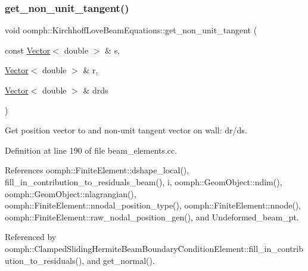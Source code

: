 \mbox{\label{classoomph_1_1KirchhoffLoveBeamEquations_a73584a8199a342faf924def94245bdfd}} 
\subsubsection{\texorpdfstring{get\+\_\+non\+\_\+unit\+\_\+tangent()}{get\_non\_unit\_tangent()}}
{\footnotesize\ttfamily void oomph\+::\+Kirchhoff\+Love\+Beam\+Equations\+::get\+\_\+non\+\_\+unit\+\_\+tangent (\begin{DoxyParamCaption}\item[{const \hyperlink{classoomph_1_1Vector}{Vector}$<$ double $>$ \&}]{s,  }\item[{\hyperlink{classoomph_1_1Vector}{Vector}$<$ double $>$ \&}]{r,  }\item[{\hyperlink{classoomph_1_1Vector}{Vector}$<$ double $>$ \&}]{drds }\end{DoxyParamCaption})}



Get position vector to and non-\/unit tangent vector on wall\+: dr/ds. 



Definition at line 190 of file beam\+\_\+elements.\+cc.



References oomph\+::\+Finite\+Element\+::dshape\+\_\+local(), fill\+\_\+in\+\_\+contribution\+\_\+to\+\_\+residuals\+\_\+beam(), i, oomph\+::\+Geom\+Object\+::ndim(), oomph\+::\+Geom\+Object\+::nlagrangian(), oomph\+::\+Finite\+Element\+::nnodal\+\_\+position\+\_\+type(), oomph\+::\+Finite\+Element\+::nnode(), oomph\+::\+Finite\+Element\+::raw\+\_\+nodal\+\_\+position\+\_\+gen(), and Undeformed\+\_\+beam\+\_\+pt.



Referenced by oomph\+::\+Clamped\+Sliding\+Hermite\+Beam\+Boundary\+Condition\+Element\+::fill\+\_\+in\+\_\+contribution\+\_\+to\+\_\+residuals(), and get\+\_\+normal().

\mbox{\label{classoomph_1_1KirchhoffLoveBeamEquations_a963a2ffb3c4008e3b9c175fc1d2d94cc}} 
